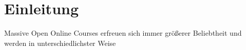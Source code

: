 \section{Einleitung}
\label{sec:einleitung}
\flushboth
\blindtext


Massive Open Online Courses erfreuen sich immer größerer Beliebtheit und werden in unterschiedlichster Weise 

